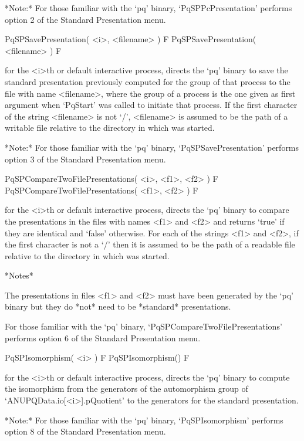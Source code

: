 \enditems

*Note:* For those familiar with  the  `pq'  binary,  `PqSPPcPresentation'
performs option 2 of the Standard Presentation menu.

\>PqSPSavePresentation( <i>, <filename> ) F
\>PqSPSavePresentation( <filename> ) F

for the <i>th or default interactive {\ANUPQ} process, directs  the  `pq'
binary to save the standard  presentation  previously  computed  for  the
group of that process to the file with name <filename>, where  the  group
of a process is the one given as first argument when `PqStart' was called
to initiate that process. If the first character of the string <filename>
is not `/', <filename> is assumed to be  the  path  of  a  writable  file
relative to the directory in which {\GAP} was started.

*Note:* For those familiar with the `pq'  binary,  `PqSPSavePresentation'
performs option 3 of the Standard Presentation menu.

\>PqSPCompareTwoFilePresentations( <i>, <f1>, <f2> ) F
\>PqSPCompareTwoFilePresentations( <f1>, <f2> ) F

for the <i>th or default interactive {\ANUPQ} process, directs  the  `pq'
binary to compare the presentations in the files with names <f1> and <f2>
and returns `true' if they are identical and `false' otherwise. For  each
of the strings <f1> and <f2>, if the first character is not a `/' then it
is assumed to be the path of a readable file relative to the directory in
which {\GAP} was started.

*Notes*

The presentations in files <f1> and <f2> must have been generated by  the
`pq' binary but they do *not* need to be *standard* presentations.

For      those      familiar      with      the       `pq'       binary,
`PqSPCompareTwoFilePresentations' performs  option  6  of  the  Standard
Presentation menu.

\>PqSPIsomorphism( <i> ) F
\>PqSPIsomorphism() F

for the <i>th or default interactive {\ANUPQ} process, directs  the  `pq'
binary to compute the isomorphism from the generators of the automorphism
group of `ANUPQData.io[<i>].pQuotient' to the generators for the standard
presentation.

*Note:* For  those  familiar  with  the  `pq'  binary,  `PqSPIsomorphism'
performs option 8 of the Standard Presentation menu.

